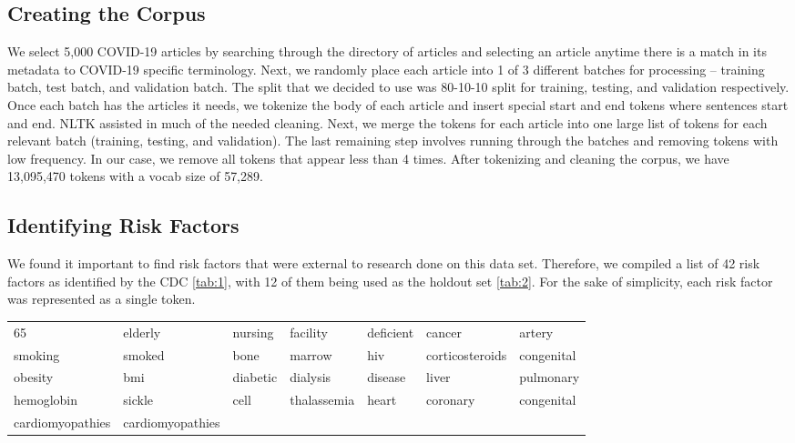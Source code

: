 \documentclass[11pt,a4paper]{article}
\begin{document}
\subsection{Creating the Corpus}
We select 5,000 COVID-19 articles by searching through the directory of articles and selecting an article anytime there is a match in its metadata to COVID-19 specific terminology. Next, we randomly place each article into 1 of 3 different batches for processing -- training batch, test batch, and validation batch. The split that we decided to use was 80-10-10 split for training, testing, and validation respectively. Once each batch has the articles it needs, we tokenize the body of each article and insert special start and end tokens where sentences start and end. NLTK assisted in much of the needed cleaning. Next, we merge the tokens for each article into one large list of tokens for each relevant batch (training, testing, and validation). The last remaining step involves running through the batches and removing tokens with low frequency. In our case, we remove all tokens that appear less than 4 times. After tokenizing and cleaning the corpus, we have 13,095,470 tokens with a vocab size of 57,289. 

\subsection{Identifying Risk Factors}
We found it important to find risk factors that were external to research done on this data set. Therefore, we compiled a list of 42 risk factors as identified by the CDC \ref{tab:1}, with 12 of them being used as the holdout set \ref{tab:2}. For the sake of simplicity, each risk factor was represented as a single token.  

\begin{table*}[h!]
    \centering
    \begin{tabular}{ l l l l l l l }
    \hline
        65 & elderly & nursing & facility & deficient & cancer & artery \\
        smoking & smoked & bone & marrow & hiv & corticosteroids & congenital  \\
        obesity & bmi & diabetic & dialysis & disease & liver & pulmonary  \\
        hemoglobin & sickle & cell & thalassemia & heart & coronary & congenital \\
        cardiomyopathies & cardiomyopathies \\
        \hline
    \end{tabular}
    \caption{Risk Factors used for capturing model hidden states for similarity comparison against all tokens in the training corpus}
    \label{tab:1}
\end{table*}
\end{document}
